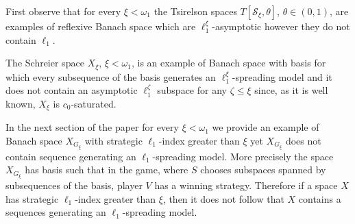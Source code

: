 \documentclass[a4paper]{amsart}
\theoremstyle{plain}
\newcommand{\mc}{\mathcal}
\begin{document}
First observe that for every $\xi<\omega_{1}$ the Tsirelson spaces
$T[\mc{S}_{\xi},\theta]$, $\theta\in (0,1)$, are examples of reflexive Banach space which
are $\ell_{1}^{\xi}$-asymptotic however they do not contain $\ell_{1}$.


The Schreier space  $X_{\xi}$, $\xi<\omega_{1}$, is an example of  Banach space  with
basis for which every subsequence of the basis   generates an $\ell_{1}^{\xi}$-spreading
model and it does not contain an asymptotic  $\ell_{1}^{\zeta}$ subspace for any
$\zeta\leq\xi$ since, as it is well known, $X_{\xi}$ is $c_0$-saturated.

In the next section of the paper for every $\xi<\omega_{1}$ we
provide an example of Banach space $X_{G_\xi}$ with  strategic
$\ell_{1}$-index greater than $\xi$ yet $X_{G_{\xi}}$ does not
contain sequence generating an $\ell_{1}$-spreading model. More
precisely the space $X_{G_{\xi}}$ has basis such that in the game,
where $S$ chooses subspaces spanned by subsequences of the basis,
player $V$ has a winning strategy. Therefore if a space $X$ has
 strategic $\ell_{1}$-index greater than $\xi$, then it does not
follow that $X$ contains a sequences generating an
$\ell_{1}$-spreading model.
\end{document}
